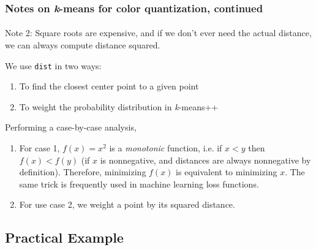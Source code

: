 \documentclass{beamer}                             %
\begin{document}
\begin{frame}
\frametitle{Notes on \textit{k}-means for color quantization, continued}
\framesubtitle{}
Note 2: Square roots are expensive, and if we don't ever need the
actual distance, we can always compute distance squared. \pause

We use \texttt{dist} in two ways:
\begin{enumerate}
  \item To find the closest center point to a given point
  \item To weight the probability distribution in \textit{k}-means++
\end{enumerate} \pause 
Performing a case-by-case analysis,
\begin{enumerate}[<+->]
  \item For case 1, \( f(x) = x^2 \) is a \textit{monotonic} function, i.e.
    if \( x < y \) then \( f(x) < f(y) \) (if \( x \) is nonnegative, and
    distances are always nonnegative by definition). Therefore, minimizing \(
    f(x) \) is equivalent to minimizing \( x \). The same trick is frequently
    used in machine learning loss functions.
  \item For use case 2, we weight a point by its squared distance.
\end{enumerate}
\end{frame}

\subsection{Practical Example}
\end{document}
